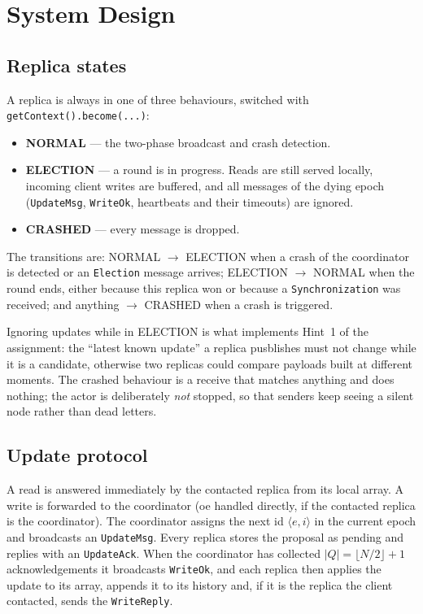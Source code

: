\section{System Design}

\subsection*{Replica states}

A replica is always in one of three behaviours, switched with \texttt{getContext().become(...)}:

\begin{itemize}
\item \textbf{NORMAL} --- the two-phase broadcast and crash detection.
\item \textbf{ELECTION} --- a round is in progress. Reads are still served locally, incoming client writes are buffered, and all messages of the dying epoch (\texttt{UpdateMsg}, \texttt{WriteOk}, heartbeats and their timeouts) are ignored.
\item \textbf{CRASHED} --- every message is dropped.
\end{itemize}

The transitions are: NORMAL $\to$ ELECTION when a crash of the coordinator is detected or an \texttt{Election} message arrives; ELECTION $\to$ NORMAL when the round ends, either because this replica won or because a \texttt{Synchronization} was received; and anything $\to$ CRASHED when a crash is triggered.

Ignoring updates while in ELECTION is what implements Hint~1 of the assignment: the ``latest known update'' a replica pusblishes must not change while it is a candidate, otherwise two replicas could compare payloads built at different moments. The crashed behaviour is a receive that matches anything and does nothing; the actor is deliberately \emph{not} stopped, so that senders keep seeing a silent node rather than dead letters.

\subsection*{Update protocol}

A read is answered immediately by the contacted replica from its local array. A write is forwarded to the coordinator (oe handled directly, if the contacted replica is the coordinator). The coordinator assigns the next id $\langle e, i \rangle$ in the current epoch and broadcasts an \texttt{UpdateMsg}. Every replica stores the proposal as pending and replies with an \texttt{UpdateAck}. When the coordinator has collected $|Q| = \lfloor N/2 \rfloor + 1$ acknowledgements it broadcasts \texttt{WriteOk}, and each replica then applies the update to its array, appends it to its history and, if it is the replica the client contacted, sends the \texttt{WriteReply}.

